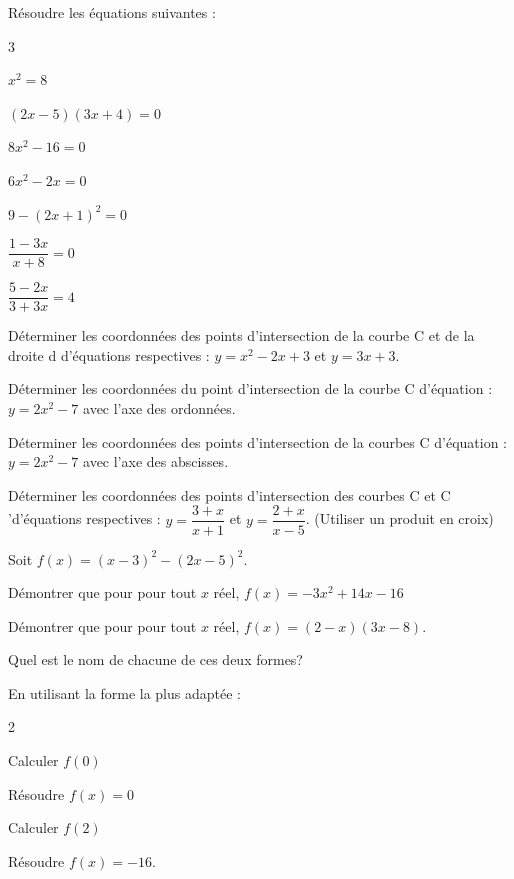 \documentclass[10pt,a4paper]{article}  %
\begin{document}
\vspace*{-0.8cm}
\exerciceDS{}
Résoudre les équations suivantes :
\begin{multicols}{3}
	\begin{enumMet}
		\item $x^{2}=8$
		\item $(2 x-5)(3 x+4)=0$
		\item $8 x^{2}-16=0$
		\item $6 x^{2}-2 x=0$
		\item $9-(2 x+1)^{2}=0$
		\item $\dfrac{1-3 x}{x+8}=0$
		\item $\dfrac{5-2 x}{3+3 x}=4$
	\end{enumMet}
\end{multicols}
\vspace*{-0.8cm}
\exerciceDS{}

\begin{enumMet}
  \item Déterminer les coordonnées des points d'intersection de la courbe C et de la droite d d'équations respectives : $y=x^{2}-2 x+3$ et $y=3 x+3$.
  \item Déterminer les coordonnées du point d'intersection de la courbe C d'équation : $y=2 x^{2}-7$ avec l'axe des ordonnées.
  \item Déterminer les coordonnées des points d'intersection de la courbes C d'équation : $y=2 x^{2}-7$ avec l'axe des abscisses.
  \item Déterminer les coordonnées des points d'intersection des courbes C et C 'd'équations respectives : $y=\dfrac{3+x}{x+1}$ et $y=\dfrac{2+x}{x-5}$. (Utiliser un produit en croix)
\end{enumMet}
\vspace*{-0.8cm}
\exerciceDS{}

Soit $f(x)=(x-3)^{2}-(2 x-5)^{2}$.

\begin{enumMet}
  \item \begin{enumMet}
  	\item Démontrer que pour pour tout $x$ réel, $f(x)=-3 x^{2}+14 x-16$
	\item Démontrer que pour pour tout $x$ réel, $f(x)=(2-x)(3 x-8)$.
  \end{enumMet}
  \item Quel est le nom de chacune de ces deux formes?
  \item En utilisant la forme la plus adaptée :
	\begin{multicols}{2}
		\begin{enumMet}
		\item Calculer $f(0)$
		\item Résoudre $f(x)=0$
		\item Calculer $f(2)$
		\item Résoudre $f(x)=-16$.
	\end{enumMet}
	\end{multicols}
\end{enumMet}
\end{document}
